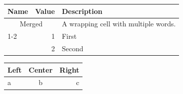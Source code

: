 \documentclass{article}
\begin{document}
\begin{tabular}{|l|r|p{90pt}|}\hline Name&Value&Description\\\hline
\multicolumn{2}{|c|}{Merged}&A wrapping cell with multiple words.\\\cline{1-2}
\multirow{2}{*}{Two}&1&First\\&2&Second\\\hline\end{tabular}
\bigskip
\begin{tabular}{@{}lcr@{}}\toprule Left&Center&Right\\\midrule a&b&c\\\bottomrule\end{tabular}
\end{document}
